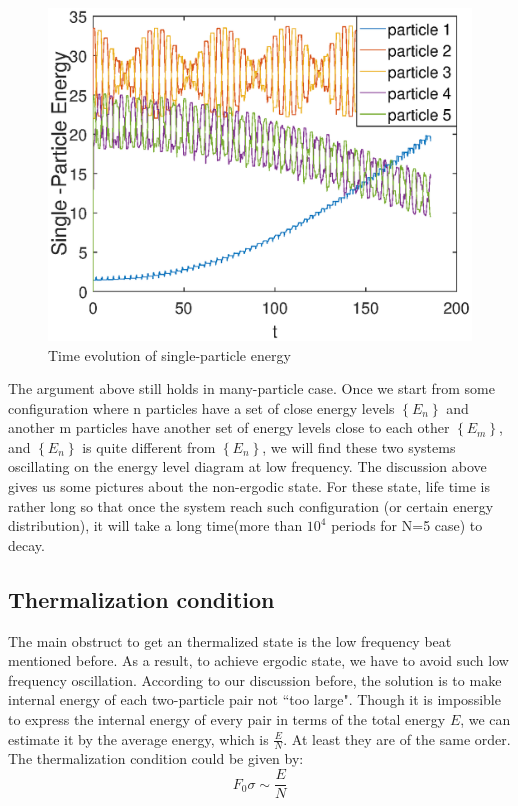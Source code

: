 \documentclass[aps,preprintnumbers,onecolumn,amsmath,amssymb,floatfix,pra]{revtex4-1}
\begin{document}
\begin{figure}
\centering
\includegraphics[scale=0.5]{ZhiyuPictures/pair1_pre.eps}
\caption{Time evolution of single-particle energy}
\label{fig:thermalization4}
\end{figure}


The argument above still holds in many-particle case. Once we start from some configuration where n particles have a set of close energy levels $\left\lbrace E_n\right\rbrace $ and another m particles have another set of energy levels close to each other $\left\lbrace E_m\right\rbrace $, and $\left\lbrace E_n\right\rbrace $ is quite different from $\left\lbrace E_n\right\rbrace $, we will find these two systems oscillating on the energy level diagram at low frequency. 
The discussion above gives us some pictures about the non-ergodic state. For these state, life time is rather long so that once the system reach such configuration (or certain energy distribution), it will take a long time(more than $10^4$ periods for N=5 case) to decay. 

\subsection{Thermalization condition}
The main obstruct to get an thermalized state is the low frequency beat mentioned before. As a result, to achieve ergodic state, we have to avoid such low frequency oscillation. According to our discussion before, the solution is to make internal energy of each two-particle pair not ``too large". Though it is impossible to express the internal energy of every pair in terms of the total energy $E$, we can estimate it by the average energy, which is $\frac{E}{N}$. At least they are of the same order. The thermalization condition could be given by:
\begin{equation}
F_0\sigma\sim\frac{E}{N}
\label{eq:thermalizatiton condition}
\end{equation}
\end{document}
